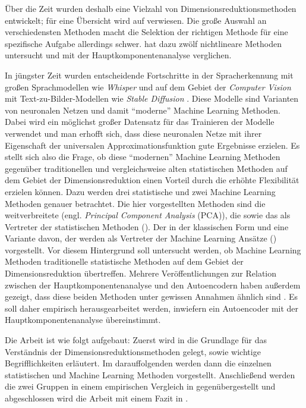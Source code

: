 Über die Zeit wurden deshalb eine Vielzahl von Dimensionsreduktionsmethoden entwickelt; für eine Übersicht wird auf \textcites{Burges.2009}{Sarveniazi.2014}{Sorzano.2014}{Cunningham.2014}{Lee.2007} verwiesen. Die große Auswahl an verschiedensten Methoden macht die Selektion der richtigen Methode für eine spezifische Aufgabe allerdings schwer. \Textcite{vanderMaaten.2009} hat dazu zwölf nichtlineare Methoden untersucht und mit der Hauptkomponentenanalyse verglichen.

In jüngster Zeit wurden entscheidende Fortschritte in der Spracherkennung mit großen Sprachmodellen
wie \textit{Whisper} \parencite{Radford.2022} und auf dem Gebiet der \textit{Computer Vision} mit Text-zu-Bilder-Modellen
wie \textit{Stable Diffusion} \parencite{Rombach.2021}. Diese Modelle sind Varianten von neuronalen Netzen und damit
\enquote{moderne} Machine Learning Methoden. Dabei wird ein möglichst großer Datensatz für das
Trainieren der Modelle verwendet und man erhofft sich, dass diese neuronalen Netze mit ihrer
Eigenschaft der universalen Approximationsfunktion \parencites[194 -- 197]{Goodfellow.2016}{Hornik.1989} gute Ergebnisse erzielen. Es stellt sich also die
Frage, ob diese \enquote{modernen} Machine Learning Methoden gegenüber traditionellen und
vergleichsweise alten statistischen Methoden auf dem Gebiet der Dimensionsreduktion einen Vorteil
durch die erhöhte Flexibilität erzielen können. Dazu werden drei statistische und zwei Machine
Learning Methoden genauer betrachtet. Die hier vorgestellten Methoden sind die weitverbreitete
 (engl. \textit{Principal Component Analysis} (PCA)), die
 sowie das  als Vertreter der statistischen
Methoden (). Der  in der klassischen
Form und eine Variante davon, der  werden als Vertreter der
Machine Learning Ansätze () vorgestellt. Vor diesem Hintergrund
soll untersucht werden, ob Machine Learning Methoden traditionelle statistische Methoden auf dem
Gebiet der Dimensionsreduktion übertreffen. Mehrere Veröffentlichungen zur Relation zwischen der
Hauptkomponentenanalyse und den Autoencodern haben außerdem gezeigt, dass diese beiden Methoden
unter gewissen Annahmen ähnlich sind \parencites{Baldi.1989}{Bourlard.1988}{Plaut.2018}. Es soll daher empirisch herausgearbeitet werden,
inwiefern ein Autoencoder mit der Hauptkomponentenanalyse übereinstimmt.

Die Arbeit ist wie folgt aufgebaut: Zuerst wird in  die Grundlage
für das Verständnis der Dimensionsreduktionsmethoden gelegt, sowie wichtige Begrifflichkeiten
erläutert. Im darauffolgenden  werden dann die einzelnen
statistischen und Machine Learning Methoden vorgestellt. Anschließend werden die zwei Gruppen in
einem empirischen Vergleich in  gegenübergestellt und abgeschlossen wird die
Arbeit mit einem Fazit in .